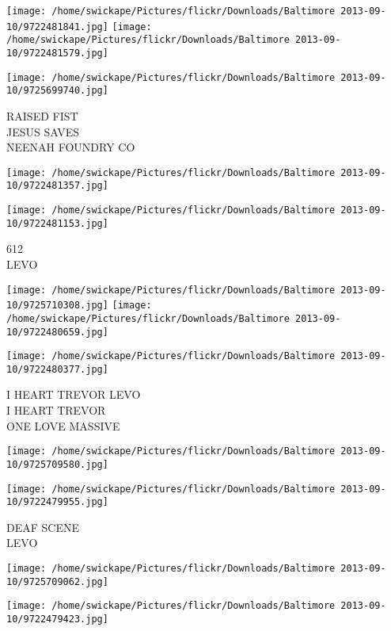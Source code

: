 \documentclass[10pt,letterpaper]{article}
\begin{document}
\texttt{[image: /home/swickape/Pictures/flickr/Downloads/Baltimore 2013-09-10/9722481841.jpg]}
\texttt{[image: /home/swickape/Pictures/flickr/Downloads/Baltimore 2013-09-10/9722481579.jpg]}

\vspace{0.25in}
\texttt{[image: /home/swickape/Pictures/flickr/Downloads/Baltimore 2013-09-10/9725699740.jpg]}

RAISED FIST\\
JESUS SAVES\\
NEENAH FOUNDRY CO\\
\pagebreak

\texttt{[image: /home/swickape/Pictures/flickr/Downloads/Baltimore 2013-09-10/9722481357.jpg]}

\vspace{0.25in}
\texttt{[image: /home/swickape/Pictures/flickr/Downloads/Baltimore 2013-09-10/9722481153.jpg]}

612\\
LEVO\\
\pagebreak

\texttt{[image: /home/swickape/Pictures/flickr/Downloads/Baltimore 2013-09-10/9725710308.jpg]}
\texttt{[image: /home/swickape/Pictures/flickr/Downloads/Baltimore 2013-09-10/9722480659.jpg]}

\texttt{[image: /home/swickape/Pictures/flickr/Downloads/Baltimore 2013-09-10/9722480377.jpg]}

I HEART TREVOR LEVO\\
I HEART TREVOR\\
ONE LOVE MASSIVE\\
\pagebreak

\texttt{[image: /home/swickape/Pictures/flickr/Downloads/Baltimore 2013-09-10/9725709580.jpg]}

\vspace{0.25in}
\texttt{[image: /home/swickape/Pictures/flickr/Downloads/Baltimore 2013-09-10/9722479955.jpg]}

DEAF SCENE\\
LEVO\\
\pagebreak

\texttt{[image: /home/swickape/Pictures/flickr/Downloads/Baltimore 2013-09-10/9725709062.jpg]}

\vspace{0.25in}
\texttt{[image: /home/swickape/Pictures/flickr/Downloads/Baltimore 2013-09-10/9722479423.jpg]}
\end{document}
